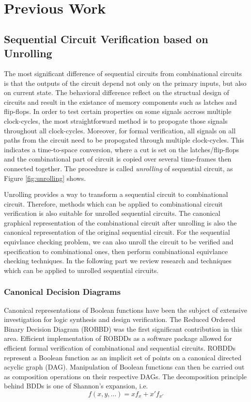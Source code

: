 \chapter{Previous Work}
\label{ch:prev}
\section{Sequential Circuit Verification based on Unrolling}
The most significant difference of sequential circuits from combinational circuits is 
that the outputs of the circuit depend not only 
on the primary inputs, but also on current state. 
The behavioral difference reflect on the structual design of circuits and result in 
the existance of memory components such as latches and flip-flops.
In order to test certain properties on some signals accross multiple clock-cycles,
the most straightforward method is to propogate those signals throughout 
all clock-cycles. Moreover, for formal verification, all signals on all paths from the circuit
need to be propogated through multiple clock-cycles.
This indicates a time-to-space conversion, where 
a cut is set on the latches/flip-flops and the combinational part of circuit
is copied over several time-frames then connected together.
The procedure is called {\it unrolling} of sequential circuit, as 
Figure \ref{fig:unrolling} shows.


Unrolling provides a way to transform a sequential circuit to combinational 
circuit. Therefore,  methods which can be applied to combinational circuit 
verification is also suitable for unrolled sequential circuits. The canonical 
graphical representation of the combinational circuit after unrolling is also 
the canonical representation of the original sequential circuit. For the sequential 
equivlance checking problem, we can also unroll the circuit to be verified and 
specification to combinational ones, then perform combinational equivlance checking
techniques. In the following part we review research and techniques which 
can be applied to unrolled sequential circuits.

\subsection{Canonical Decision Diagrams}
Canonical representations of Boolean functions have been the subject
of extensive investigation for logic synthesis and design
verification. The Reduced Ordered Binary Decision Diagram (ROBBD)
\cite{BRYA86} was the first significant contribution in this area. 
Efficient implementation of ROBDDs as a software package \cite{brace}
allowed for efficient formal verification of combinational and
sequential circuits.  ROBDDs represent a Boolean function as an
implicit set of points on a canonical directed acyclic graph
(DAG). Manipulation of Boolean functions can then be carried out as
composition operations on their respective DAGs.  The decomposition
principle behind BDDs is one of Shannon's expansion, i.e.
\begin{equation}
f(x, y, \dots) = x f_x + x' f_{x'}
\end{equation}

